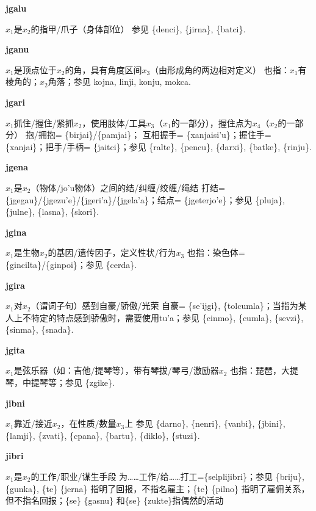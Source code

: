 \documentclass[notitlepage,twocolumn,a4paper,10pt]{book}
\begin{document}
{\sffamily\bfseries jgalu}\enspace {\ttfamily\bfseries[        ja'u]}  $x_1$是$x_2$的指甲\slash{}爪子（身体部位） \textemdash{} 参见 \{denci\}, \{jirna\}, \{batci\}.

{\sffamily\bfseries jganu}\enspace {\ttfamily\bfseries[    jga]}  $x_1$是顶点位于$x_2$的角，具有角度区间$x_3$（由形成角的两边相对定义） \textemdash{} 也指：$x_1$有棱角的；$x_2$角落；参见 {kojna}, {linji}, {konju}, {mokca}.

{\sffamily\bfseries jgari}\enspace {\ttfamily\bfseries[        jai]}  $x_1$抓住\slash{}握住\slash{}紧抓$x_2$，使用肢体\slash{}工具$x_3$（$x_1$的一部分），握住点为$x_4$（$x_2$的一部分） \textemdash{} 抱\slash{}拥抱= \{birjai\}\slash{}\{pamjai\}； 互相握手= \{xanjaisi'u\}；握住手= \{xanjai\}；把手\slash{}手柄= \{jaitci\}；参见 \{ralte\}, \{pencu\}, \{darxi\}, \{batke\}, \{rinju\}.

{\sffamily\bfseries jgena}\enspace {\ttfamily\bfseries[    jge]}  $x_1$是$x_2$（物体\slash{}jo'u物体）之间的结\slash{}纠缠\slash{}绞缠\slash{}绳结 \textemdash{} 打结=\{jgegau\}\slash{}\{jgezu'e\}\slash{}\{jgeri'a\}\slash{}\{jgela'a\}；结点= \{jgeterjo'e\}；参见 \{pluja\}, \{julne\}, \{lasna\}, \{skori\}.

{\sffamily\bfseries jgina}\enspace {\ttfamily\bfseries[gin]}  $x_1$是生物$x_2$的基因\slash{}遗传因子，定义性状\slash{}行为$x_3$ \textemdash{} 也指：染色体=\{gincilta\}\slash{}\{ginpoi\}；参见 \{cerda\}.

{\sffamily\bfseries jgira}\enspace {\ttfamily\bfseries[    jgi]}  $x_1$对$x_2$（谓词子句）感到自豪\slash{}骄傲\slash{}光荣 \textemdash{} 自豪= \{se'ijgi\}, \{tolcumla\}；当指为某人上不特定的特点感到骄傲时，需要使用tu'a；参见 \{cinmo\}, \{cumla\}, \{sevzi\}, \{sinma\}, \{snada\}.

{\sffamily\bfseries jgita}\enspace {\ttfamily\bfseries[git]}  $x_1$是弦乐器（如：吉他\slash{}提琴等），带有琴拔\slash{}琴弓\slash{}激励器$x_2$ \textemdash{} 也指：琵琶，大提琴，中提琴等；参见 \{zgike\}.

{\sffamily\bfseries jibni}\enspace {\ttfamily\bfseries[    jbi]}  $x_1$靠近\slash{}接近$x_2$，在性质\slash{}数量$x_3$上 \textemdash{} 参见 \{darno\}, \{nenri\}, \{vanbi\}, \{jbini\}, \{lamji\}, \{zvati\}, \{cpana\}, \{bartu\}, \{diklo\}, \{stuzi\}.

{\sffamily\bfseries jibri}\enspace {\ttfamily\bfseries[jib]}  $x_1$是$x_2$的工作\slash{}职业\slash{}谋生手段 \textemdash{} 为……工作\slash{}给……打工=\{selplijibri\}；参见 \{briju\}, \{gunka\}, \{te\} \{jerna\} 指明了回报，不指名雇主；\{te\} \{pilno\} 指明了雇佣关系，但不指名回报；\{se\} \{gasnu\} 和\{se\} \{zukte\}指偶然的活动
\end{document}
